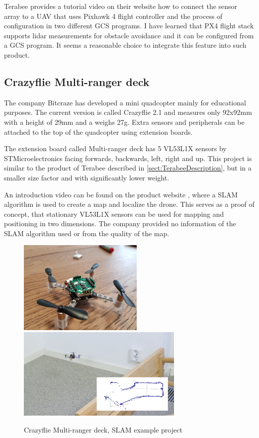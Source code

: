 Terabee provides a tutorial video on their website\cite{TerabeeTeraRanger} how to connect the 
sensor array to a UAV that uses Pixhawk 4 flight controller and the process of configuration 
in two different GCS programs. I have learned that PX4 flight stack supports lidar measurements
for obstacle avoidance and it can be configured from a GCS program. It seems a reasonable choice 
to integrate this feature into such product.

\subsection{Crazyflie Multi-ranger deck}
The company Bitcraze has developed a mini quadcopter mainly for educational purposes. The current version is
called Crazyflie 2.1 and measures only 92x92mm with a height of 29mm and a weighs 27g.
Extra sensors and peripherals can be attached to the top of the quadcopter using extension boards.

The extension board called Multi-ranger deck has 5 VL53L1X sensors by STMicroelectronics facing forwards, 
backwards, left, right and up. This project is similar to the product of Terabee described in \ref{sect:TerabeeDescription}, 
but in a smaller size factor and with significantly lower weight.

An introduction video can be found on the product website \cite{BitcrazeMultirangerDeck}, where 
a SLAM algorithm is used to create a map and localize the drone. This serves as a proof of concept,
that stationary VL53L1X sensors can be used for mapping and positioning in two dimensions. The company provided 
no information of the SLAM algorithm used or from the quality of the map.
\newpage
\begin{figure}[h]
    \centering
    \includegraphics[width=60mm, keepaspectratio]{figures/multiranger_deck.jpg}
    \includegraphics[width=80mm, keepaspectratio]{figures/multiranger_slam.png}
    \caption{Crazyflie Multi-ranger deck, SLAM example project}
    \label{fig:crazyflie_multiranger}
\end{figure}

